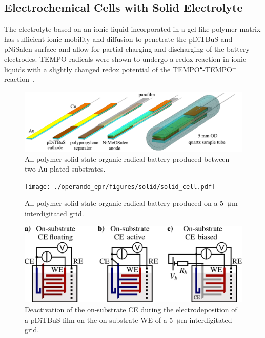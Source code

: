 \subsection{Electrochemical Cells with Solid Electrolyte}
The electrolyte based on an ionic liquid incorporated in a gel-like polymer matrix has sufficient ionic mobility and diffusion to penetrate the pDiTBuS and pNiSalen surface and allow for partial charging and discharging of the battery electrodes. TEMPO radicals were shown to undergo a redox reaction in ionic liquids with a slightly changed redox potential of the TEMPO$^{\bullet}$-TEMPO$^+$ reaction~\cite{Golovisnina2023}.

\begin{figure}[h]
\center
	\includegraphics[width=1\textwidth]{./operando_epr/figures/sandwich/sandwich.pdf}
	\caption{All-polymer solid state organic radical battery produced between two Au-plated substrates.}
	\label{fig:sandwich_assembly}
\end{figure}



\begin{figure}[h]
\center
	\texttt{[image: ./operando\_epr/figures/solid/solid\_cell.pdf]}
	\caption{All-polymer solid state organic radical battery produced on a 5~$\muup$m interdigitated grid.}
	\label{fig:transistor_battery_assewmbly}
\end{figure}


\begin{figure}[h]
\center
	\includegraphics[width=1\textwidth]{./operando_epr/figures/solid/separate_deposition.pdf}
	\caption{Deactivation of the on-substrate CE during the electrodeposition of a pDiTBuS film on the on-substrate WE of a 5~$\muup$m interdigitated grid.}
	\label{fig:transistor_battery_deposition}
\end{figure}

